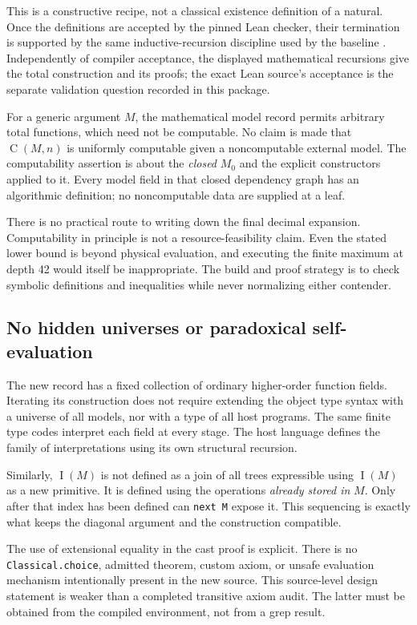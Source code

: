 \documentclass[11pt,letterpaper]{article}
\theoremstyle{definition}
\newcommand{\Val}{\operatorname{C}}
\newcommand{\idx}{\operatorname{I}}
\newcommand{\code}[1]{\texttt{#1}}
\begin{document}
This is a constructive recipe, not a classical existence definition of a
natural. Once the definitions are accepted by the pinned Lean checker, their
termination is supported by the same inductive-recursion discipline used by
the baseline \cite{lean-recursion,lean-inductive}. Independently of compiler
acceptance, the displayed mathematical recursions give the total construction
and its proofs; the exact Lean source's acceptance is the separate validation
question recorded in this package.

For a generic argument $M$, the mathematical model record permits arbitrary
total functions, which need not be computable. No claim is made that
$\Val(M,n)$ is uniformly computable given a noncomputable external model.
The computability assertion is about the \emph{closed} $M_0$ and the explicit
constructors applied to it. Every model field in that closed dependency graph
has an algorithmic definition; no noncomputable data are supplied at a leaf.

There is no practical route to writing down the final decimal expansion.
Computability in principle is not a resource-feasibility claim. Even the
stated lower bound is beyond physical evaluation, and executing the finite
maximum at depth 42 would itself be inappropriate. The build and proof
strategy is to check symbolic definitions and inequalities while never
normalizing either contender.

\subsection{No hidden universes or paradoxical self-evaluation}

The new record has a fixed collection of ordinary higher-order function
fields. Iterating its construction does not require extending the object type
syntax with a universe of all models, nor with a type of all host programs.
The same finite type codes interpret each field at every stage. The host
language defines the family of interpretations using its own structural
recursion.

Similarly, $\idx(M)$ is not defined as a join of all trees expressible using
$\idx(M)$ as a new primitive. It is defined using the operations \emph{already
stored in} $M$. Only after that index has been defined can \code{next M}
expose it. This sequencing is exactly what keeps the diagonal argument and
the construction compatible.

The use of extensional equality in the cast proof is explicit. There is no
\code{Classical.choice}, admitted theorem, custom axiom, or unsafe evaluation
mechanism intentionally present in the new source. This source-level design
statement is weaker than a completed transitive axiom audit. The latter must
be obtained from the compiled environment, not from a grep result.
\end{document}

